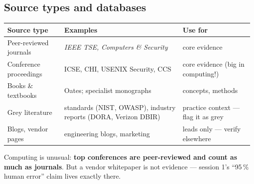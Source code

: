 \documentclass[11pt,a4paper,british,twoside=false,headings=small,chapterprefix=false,numbers=noenddot]{scrbook}
\begin{document}
\subsection{Source types and databases}
\begin{center}\small
\small
  \renewcommand{\arraystretch}{1.3}
  \begin{tabular}{@{}p{4.3cm}p{5.6cm}p{3.2cm}@{}}
    \toprule
    \textbf{Source type} & \textbf{Examples} & \textbf{Use for}\\
    \midrule
    Peer-reviewed journals & \emph{IEEE TSE, Computers \& Security} & core evidence\\
    Conference proceedings & ICSE, CHI, USENIX Security, CCS & core evidence (big in computing!)\\
    Books \& textbooks & Oates; specialist monographs & concepts, methods\\
    Grey literature & standards (NIST, OWASP), industry reports (DORA, Verizon DBIR) & practice context --- flag it as grey\\
    Blogs, vendor pages & engineering blogs, marketing & leads only --- verify elsewhere\\
    \bottomrule
  \end{tabular}
  

  Computing is unusual: \textbf{top conferences are peer-reviewed and count
  as much as journals}. But a vendor whitepaper is not evidence --- session 1's
  ``95\,\% human error'' claim lives exactly there.
\end{center}
\end{document}
